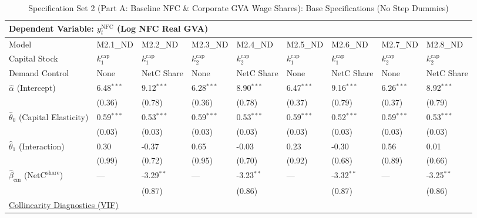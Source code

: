\begin{table}[H]
\centering
\caption{Specification Set 2 (Part A: Baseline NFC \& Corporate GVA Wage Shares): Base Specifications (No Step Dummies)}
\label{tab:spec_set_2_a_nd}
\scriptsize
\begin{tabular}{p{3.8cm}p{1.35cm}p{1.35cm}p{1.35cm}p{1.35cm}p{1.35cm}p{1.35cm}p{1.35cm}p{1.35cm}}
\toprule
\multicolumn{9}{l}{\textbf{Dependent Variable: $y_t^{\text{NFC}}$ (Log NFC Real GVA)}} \\
\midrule
Model & M2.1\_ND & M2.2\_ND & M2.3\_ND & M2.4\_ND & M2.5\_ND & M2.6\_ND & M2.7\_ND & M2.8\_ND  \\
Capital Stock & $k^{\text{cap}}_1$ & $k^{\text{cap}}_1$ & $k^{\text{cap}}_2$ & $k^{\text{cap}}_2$ & $k^{\text{cap}}_1$ & $k^{\text{cap}}_1$ & $k^{\text{cap}}_2$ & $k^{\text{cap}}_2$  \\
Demand Control & None & NetC Share & None & NetC Share & None & NetC Share & None & NetC Share  \\
\midrule
$\hat{\alpha}$ (Intercept)  & 6.48$^{***}$ & 9.12$^{***}$ & 6.28$^{***}$ & 8.90$^{***}$ & 6.47$^{***}$ & 9.16$^{***}$ & 6.26$^{***}$ & 8.92$^{***}$  \\
 & {\scriptsize (0.36)} & {\scriptsize (0.78)} & {\scriptsize (0.36)} & {\scriptsize (0.78)} & {\scriptsize (0.37)} & {\scriptsize (0.79)} & {\scriptsize (0.37)} & {\scriptsize (0.79)}  \\
[1ex]
$\hat{\theta}_0$ (Capital Elasticity)  & 0.59$^{***}$ & 0.53$^{***}$ & 0.59$^{***}$ & 0.53$^{***}$ & 0.59$^{***}$ & 0.52$^{***}$ & 0.59$^{***}$ & 0.53$^{***}$  \\
 & {\scriptsize (0.03)} & {\scriptsize (0.03)} & {\scriptsize (0.03)} & {\scriptsize (0.03)} & {\scriptsize (0.03)} & {\scriptsize (0.03)} & {\scriptsize (0.03)} & {\scriptsize (0.03)}  \\
$\hat{\theta}_1$ (Interaction)  & 0.30 & -0.37 & 0.65 & -0.03 & 0.23 & -0.30 & 0.56 & 0.01  \\
 & {\scriptsize (0.99)} & {\scriptsize (0.72)} & {\scriptsize (0.95)} & {\scriptsize (0.70)} & {\scriptsize (0.92)} & {\scriptsize (0.68)} & {\scriptsize (0.89)} & {\scriptsize (0.66)}  \\
$\hat{\beta}_{\text{cm}}$ ($\text{NetC}^{\text{share}}$)  & --- & -3.29$^{**}$ & --- & -3.23$^{**}$ & --- & -3.32$^{**}$ & --- & -3.25$^{**}$  \\
 &  & {\scriptsize (0.87)} &  & {\scriptsize (0.86)} &  & {\scriptsize (0.87)} &  & {\scriptsize (0.86)}  \\
\midrule
\multicolumn{9}{l}{\underline{Collinearity Diagnostics (VIF)}} \\

\end{tabular}
\end{table}
